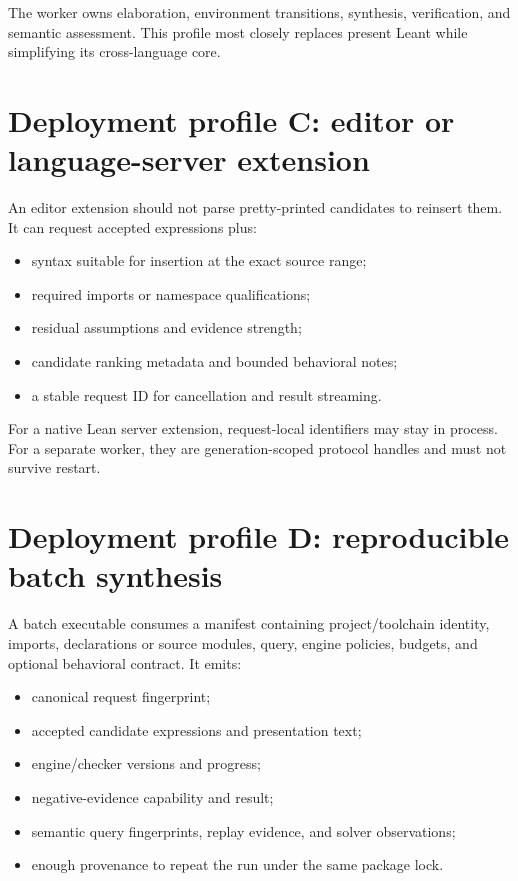 \documentclass[10pt,letterpaper,oneside]{report}
\begin{document}
The worker owns elaboration, environment transitions, synthesis, verification, and semantic assessment. This profile most closely replaces present Leant while simplifying its cross-language core.

\section{Deployment profile C: editor or language-server extension}

An editor extension should not parse pretty-printed candidates to reinsert them. It can request accepted expressions plus:

\begin{itemize}
  \item syntax suitable for insertion at the exact source range;
  \item required imports or namespace qualifications;
  \item residual assumptions and evidence strength;
  \item candidate ranking metadata and bounded behavioral notes;
  \item a stable request ID for cancellation and result streaming.
\end{itemize}

For a native Lean server extension, request-local identifiers may stay in process. For a separate worker, they are generation-scoped protocol handles and must not survive restart.

\section{Deployment profile D: reproducible batch synthesis}

A batch executable consumes a manifest containing project/toolchain identity, imports, declarations or source modules, query, engine policies, budgets, and optional behavioral contract. It emits:

\begin{itemize}
  \item canonical request fingerprint;
  \item accepted candidate expressions and presentation text;
  \item engine/checker versions and progress;
  \item negative-evidence capability and result;
  \item semantic query fingerprints, replay evidence, and solver observations;
  \item enough provenance to repeat the run under the same package lock.
\end{itemize}
\end{document}
